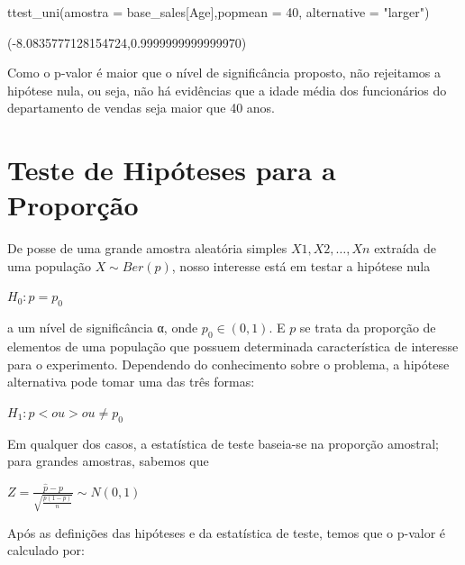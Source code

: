 \documentclass[
  letterpaper,
  DIV=11,
  numbers=noendperiod]{scrreprt}
\newenvironment{Shaded}{\begin{snugshade}}{\end{snugshade}}
\newcommand{\DecValTok}[1]{\textcolor[rgb]{0.68,0.00,0.00}{#1}}
\newcommand{\NormalTok}[1]{\textcolor[rgb]{0.00,0.23,0.31}{#1}}
\newcommand{\OperatorTok}[1]{\textcolor[rgb]{0.37,0.37,0.37}{#1}}
\newcommand{\StringTok}[1]{\textcolor[rgb]{0.13,0.47,0.30}{#1}}
\begin{document}
\begin{Shaded}
\begin{Highlighting}[]
\NormalTok{ttest\_uni(amostra }\OperatorTok{=}\NormalTok{ base\_sales[}\StringTok{\textquotesingle{}Age\textquotesingle{}}\NormalTok{],popmean }\OperatorTok{=} \DecValTok{40}\NormalTok{, alternative }\OperatorTok{=} \StringTok{"larger"}\NormalTok{)}
\end{Highlighting}
\end{Shaded}

\begin{tcolorbox}[enhanced jigsaw, breakable, leftrule=.75mm, left=2mm, opacityback=0, bottomrule=.15mm, toprule=.15mm, rightrule=.15mm, arc=.35mm, colback=white]

(-8.0835777128154724,0.9999999999999970)

\end{tcolorbox}

Como o p-valor é maior que o nível de significância proposto, não
rejeitamos a hipótese nula, ou seja, não há evidências que a idade média
dos funcionários do departamento de vendas seja maior que 40 anos.

\hypertarget{teste-de-hipuxf3teses-para-a-proporuxe7uxe3o}{%
\section{Teste de Hipóteses para a
Proporção}\label{teste-de-hipuxf3teses-para-a-proporuxe7uxe3o}}

De posse de uma grande amostra aleatória simples \(X1, X2,…,Xn\)
extraída de uma população \(X ∼ Ber(p)\), nosso interesse está em testar
a hipótese nula

\(H_{0} : p = p_{0}\)

a um nível de significância α, onde \(p_0 \in (0,1)\). E \(p\) se trata
da proporção de elementos de uma população que possuem determinada
característica de interesse para o experimento. Dependendo do
conhecimento sobre o problema, a hipótese alternativa pode tomar uma das
três formas:

\(H_{1} : p < ou > ou \neq p_{0}\)

Em qualquer dos casos, a estatística de teste baseia-se na proporção
amostral; para grandes amostras, sabemos que

\(Z = \frac{\hat{p}-p}{\sqrt{\frac{p\left ( 1-p \right )}{n}}} \sim N(0,1)\)

Após as definições das hipóteses e da estatística de teste, temos que o
p-valor é calculado por:
\end{document}
